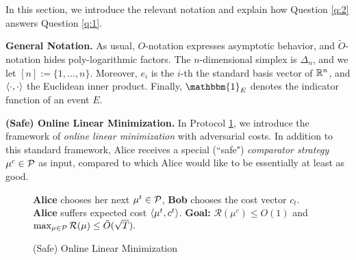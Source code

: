 \documentclass[11pt]{article}
\begin{document}
In this section, we introduce the relevant notation and explain how Question \ref{q:2} answers Question \ref{q:1}. 

\textbf{General Notation.} As usual, $O$-notation expresses asymptotic behavior, and $\tilde{O}$-notation hides poly-logarithmic factors. The $n$-dimensional simplex is $\Delta_n$, and we let $[n]:=\{1,\dots,n\}$. Moreover, $e_i$ is the $i$-th the standard basis vector of $\mathbb{R}^n$, and $\left\langle \cdot, \cdot \right\rangle$ the Euclidean inner product. Finally, $\mathbbm{1}_E$ denotes the indicator function of an event $E$.

\textbf{(Safe) Online Linear Minimization.} In Protocol \ref{prot:olm}, we introduce the framework of \emph{online linear minimization} \citep[OLM]{H17} with adversarial costs. In addition to this standard framework, Alice receives a special (``safe") \emph{comparator strategy} $\mu^c\in\mathcal{P}$ as input, compared to which Alice would like to be essentially at least as good.
\begin{figure}[H]
\centering
\begin{minipage}{1.0\textwidth}
\begin{protocol}[H]
    \normalsize
    \caption{(Safe) Online Linear Minimization} 
    \label{prot:olm}
    \centering
    \begin{algorithmic}
            \State \textbf{Alice} chooses her next $\mu^t \in \mathcal{P}$, \textbf{Bob} chooses the cost vector $c_t$.
            \State \textbf{Alice} suffers expected cost $\left\langle \mu^t, c^t \right\rangle$.
        \EndFor
        \hspace{-0.33cm}\textbf{Goal:} $\mathcal{R}(\mu^c) \leq O(1)$ and $\max_{\mu\in\mathcal{P}}\mathcal{R}(\mu)\leq \tilde{O}(\sqrt{T}).$
    \end{algorithmic}
\end{protocol}
\end{minipage}
\end{figure}
\end{document}

